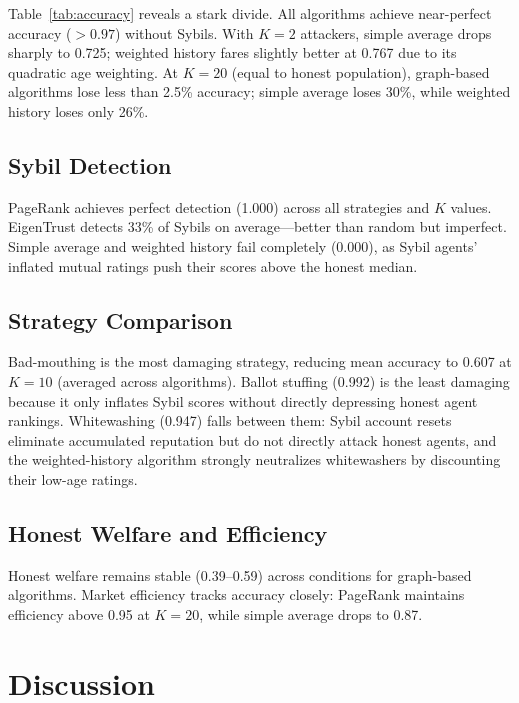 \documentclass[11pt]{article}
\begin{document}
Table~\ref{tab:accuracy} reveals a stark divide.
All algorithms achieve near-perfect accuracy ($>0.97$) without Sybils.
With $K{=}2$ attackers, simple average drops sharply to 0.725; weighted history fares slightly better at 0.767 due to its quadratic age weighting.
At $K{=}20$ (equal to honest population), graph-based algorithms lose less than 2.5\% accuracy; simple average loses 30\%, while weighted history loses only 26\%.

\subsection{Sybil Detection}

PageRank achieves perfect detection (1.000) across all strategies and $K$ values.
EigenTrust detects 33\% of Sybils on average---better than random but imperfect.
Simple average and weighted history fail completely (0.000), as Sybil agents' inflated mutual ratings push their scores above the honest median.

\subsection{Strategy Comparison}

Bad-mouthing is the most damaging strategy, reducing mean accuracy to 0.607 at $K{=}10$ (averaged across algorithms).
Ballot stuffing (0.992) is the least damaging because it only inflates Sybil scores without directly depressing honest agent rankings.
Whitewashing (0.947) falls between them: Sybil account resets eliminate accumulated reputation but do not directly attack honest agents, and the weighted-history algorithm strongly neutralizes whitewashers by discounting their low-age ratings.

\subsection{Honest Welfare and Efficiency}

Honest welfare remains stable (0.39--0.59) across conditions for graph-based algorithms.
Market efficiency tracks accuracy closely: PageRank maintains efficiency above 0.95 at $K{=}20$, while simple average drops to 0.87.

\section{Discussion}
\end{document}

